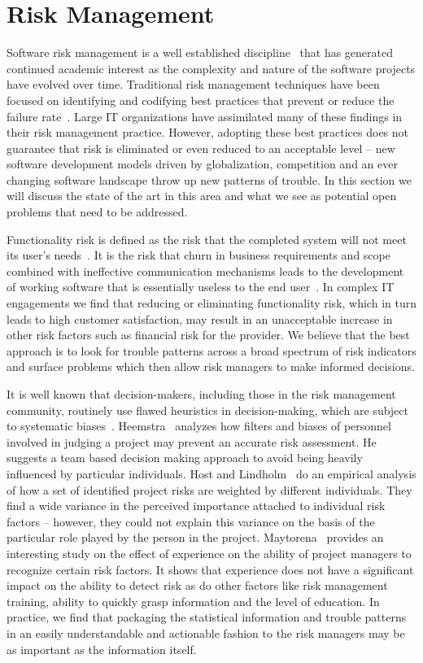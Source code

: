 \section{Risk Management}

Software risk management is a well established discipline~\cite{risk1,risk2} that has generated continued academic interest as the complexity and nature of the software projects have evolved over time. Traditional risk management techniques have been focused on identifying and codifying best practices that prevent or reduce the failure rate~\cite{risk3,risk4,risk5,risk6,risk7}. Large IT organizations have assimilated many of these findings in their risk management practice.  However, adopting these best practices does not guarantee that risk is eliminated or even reduced to an acceptable level -- new software development models driven by globalization, competition and an ever changing software landscape throw up new patterns of trouble. In this section we will discuss the state of the art in this area and what we see as potential open problems that need to be addressed.

Functionality risk is defined as the risk that the completed system will not meet its user's needs~\cite{risk11}.  It is the risk that churn in business requirements and scope combined with ineffective communication mechanisms leads to the development of working software that is essentially useless to the end user~\cite{risk12}. In complex IT engagements we find that reducing or eliminating functionality risk, which in turn leads to high customer satisfaction, may result in an unacceptable increase in other risk factors such as financial risk for the provider. We believe that the best approach is to look for trouble patterns across a broad spectrum of risk indicators and surface problems which then allow risk managers to make informed decisions.

It is well known that decision-makers, including those in the risk management community, routinely use flawed heuristics in decision-making, which are subject to systematic biases~\cite{risk27}. Heemstra~\cite{risk24} analyzes how filters and biases of personnel involved in judging a project may prevent an accurate risk assessment. He suggests a team based decision making approach to avoid being heavily influenced by particular individuals. Host and Lindholm~\cite{risk25}  do an empirical analysis of how a set of identified project risks are weighted by different individuals. They find a wide variance in the perceived importance attached to individual risk factors -- however, they could not explain this variance on the basis of the particular role played by the person in the project. Maytorena~\cite{risk26} provides an interesting study on the effect of experience on the ability of project managers to recognize certain risk factors. It shows that experience does not have a significant impact on the ability to detect risk as do other factors like risk management training, ability to quickly grasp information and the level of education. In practice, we find that packaging the statistical information and trouble patterns in an easily understandable and actionable fashion to the risk managers may be as important as the information itself.

